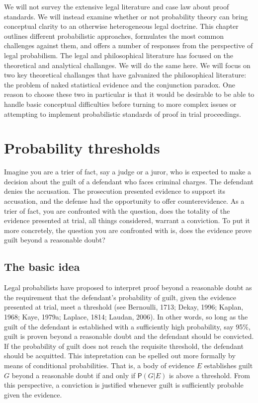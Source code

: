 \documentclass[10pt,dvipsnames,enabledeprecatedfontcommands]{scrartcl}
\newcommand{\pr}[1]{\mathsf{P}(#1)}
\begin{document}
 We will not survey
the extensive legal literature and case law about proof standards. We
will instead examine whether or not probability theory can bring
conceptual clarity to an otherwise heterogeneous legal doctrine. This
chapter outlines different probabilistic approaches, formulates the most
common challenges against them, and offers a number of responses from
the perspective of legal probabilism. The legal and philosophical
literature has focused on the theoretical and analytical challanges. We
will do the same here. We will focus on two key theoretical challanges
that have galvanized the philosophical literature: the problem of naked
statistical evidence and the conjunction paradox. One reason to choose
these two in particular is that it would be desirable to be able to
handle basic conceptual difficulties before turning to more complex
issues or attempting to implement probabilistic standards of proof in
trial proceedings.

\section{Probability thresholds}\label{probability-thresholds}

Imagine you are a trier of fact, say a judge or a juror, who is expected
to make a decision about the guilt of a defendant who faces criminal
charges. The defendant denies the accusation. The prosecution presented
evidence to support its accusation, and the defense had the opportunity
to offer counterevidence. As a trier of fact, you are confronted with
the question, does the totality of the evidence presented at trial, all
things considered, warrant a conviction. To put it more concretely, the
question you are confronted with is, does the evidence prove guilt
beyond a reasonable doubt?

\subsection{The basic idea}\label{the-basic-idea}

Legal probabilists have proposed to interpret proof beyond a reasonable
doubt as the requirement that the defendant's probability of guilt,
given the evidence presented at trial, meet a threshold (see Bernoulli,
1713; Dekay, 1996; Kaplan, 1968; Kaye, 1979a; Laplace, 1814; Laudan,
2006). In other words, so long as the guilt of the defendant is
established with a sufficiently high probability, say 95\%, guilt is
proven beyond a reasonable doubt and the defendant should be convicted.
If the probability of guilt does not reach the requisite threshold, the
defendant should be acquitted. This intepretation can be spelled out
more formally by means of conditional probabilities. That is, a body of
evidence \(E\) establishes guilt \(G\) beyond a reasonable doubt if and
only if \(\pr{G\vert E}\) is above a threshold. From this perspective, a
conviction is justified whenever guilt is sufficiently probable given
the evidence.
\end{document}
